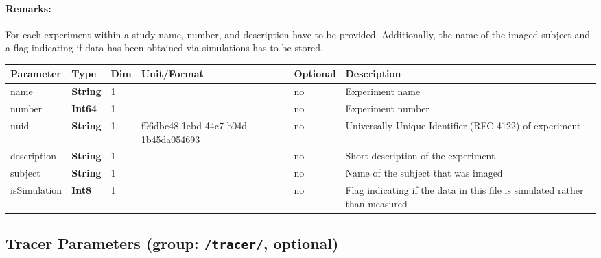\documentclass[landscape,a4paper]{article} %
\newcommand{\inl}[1]{\lstinline[columns=fixed]{#1}}
\newcommand{\inltab}[1]{{\ttfamily\bfseries\color{blue}#1}}
\newcommand{\inlvar}[1]{{\ttfamily#1}}
\begin{document}
\begin{multicols}{2}
\paragraph{Remarks:} For each experiment within a study \inlvar{name}, \inlvar{number}, and \inlvar{description} have to be provided. Additionally, the name of the imaged subject and a flag indicating if data has been obtained via simulations has to be stored.
\end{multicols}

\noindent \begin{tabularx}{\columnwidth}{lllllX} 
\textbf{Parameter} & \textbf{Type} & \textbf{Dim} & \textbf{Unit/Format} & \textbf{Optional} & \textbf{Description} \\ \hline 
\inlvar{name} & \inltab{String} & 1 & & no & Experiment name \\ \hline
\inlvar{number} & \inltab{Int64} & 1 & & no & Experiment number\\ \hline
\inlvar{uuid} & \inltab{String} & 1 & f96dbc48-1ebd-44c7-b04d-1b45da054693 & no & Universally Unique Identifier (RFC 4122) of experiment \\ \hline 
\inlvar{description} & \inltab{String} & 1 & & no & Short description of the experiment \\ \hline
\inlvar{subject} & \inltab{String} & 1 & & no & Name of the subject that was imaged \\ \hline 
\inlvar{isSimulation} & \inltab{Int8} & 1 & & no & Flag indicating if the data in this file is simulated rather than measured \\ \hline
\end{tabularx}


\subsection{Tracer Parameters (group: \inl{/tracer/}, optional)}
\end{document}

